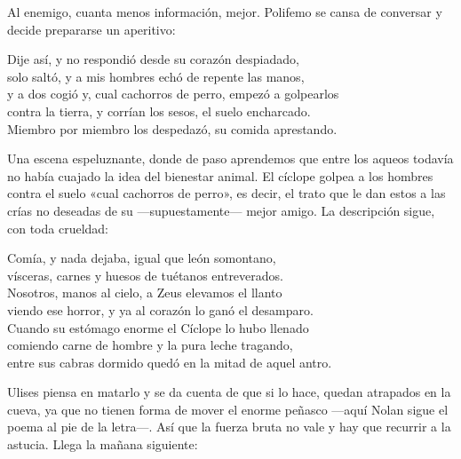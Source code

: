 Al enemigo, cuanta menos información, mejor. Polifemo se cansa de conversar y decide prepararse un aperitivo:

\begin{versocita}
Dije así, y no respondió desde su corazón despiadado,\\
solo saltó, y a mis hombres echó de repente las manos,\\
y a dos cogió y, cual cachorros de perro, empezó a golpearlos\\
contra la tierra, y corrían los sesos, el suelo encharcado.\\
Miembro por miembro los despedazó, su comida aprestando.
\end{versocita}

Una escena espeluznante, donde de paso aprendemos que entre los aqueos todavía no había cuajado la idea del bienestar animal. El cíclope golpea a los hombres contra el suelo «cual cachorros de perro», es decir, el trato que le dan estos a las crías no deseadas de su ---supuestamente--- mejor amigo. La descripción sigue, con toda crueldad:

\begin{versocita}
Comía, y nada dejaba, igual que león somontano,\\
vísceras, carnes y huesos de tuétanos entreverados.\\
Nosotros, manos al cielo, a Zeus elevamos el llanto\\
viendo ese horror, y ya al corazón lo ganó el desamparo.\\
Cuando su estómago enorme el Cíclope lo hubo llenado\\
comiendo carne de hombre y la pura leche tragando,\\
entre sus cabras dormido quedó en la mitad de aquel antro.
\end{versocita}

Ulises piensa en matarlo y se da cuenta de que si lo hace, quedan atrapados en la cueva, ya que no tienen forma de mover el enorme peñasco ---aquí Nolan sigue el poema al pie de la letra---. Así que la fuerza bruta no vale y hay que recurrir a la astucia. Llega la mañana siguiente:

